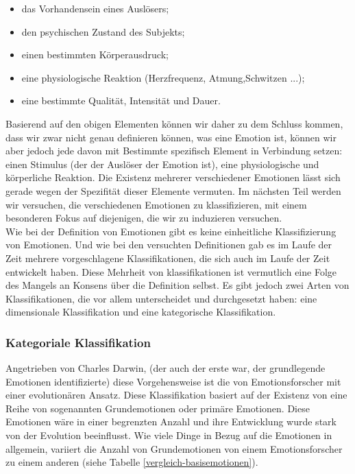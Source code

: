 \begin{itemize} \setlength\itemsep{-0.15cm}
  \item das Vorhandensein eines Auslösers;
  \item den psychischen Zustand des Subjekts;
  \item einen bestimmten Körperausdruck;
  \item eine physiologische Reaktion (Herzfrequenz, Atmung,Schwitzen ...);
  \item eine bestimmte Qualität, Intensität und Dauer.
\end{itemize}


Basierend auf den obigen Elementen können wir daher zu dem Schluss kommen, dass wir zwar nicht genau definieren können, was eine Emotion ist, können wir aber jedoch jede davon mit Bestimmte spezifisch  Element in Verbindung setzen: einen Stimulus (der der Auslöser der Emotion ist), eine physiologische und körperliche Reaktion. 
Die Existenz mehrerer verschiedener Emotionen lässt sich gerade wegen der Spezifität dieser Elemente vermuten. 
Im nächsten Teil werden wir versuchen, die verschiedenen Emotionen zu klassifizieren, mit einem besonderen Fokus auf diejenigen, die wir zu induzieren versuchen. \\


Wie bei der Definition von Emotionen gibt es keine einheitliche Klassifizierung von Emotionen. 
Und wie bei den versuchten Definitionen gab es im Laufe der Zeit mehrere vorgeschlagene Klassifikationen, die sich auch im Laufe der Zeit entwickelt haben. 
Diese Mehrheit von klassifikationen ist vermutlich eine Folge des Mangels an Konsens über die Definition selbst. 
Es gibt jedoch zwei Arten von Klassifikationen, die vor allem unterscheidet und durchgesetzt haben: eine dimensionale Klassifikation\cite{geslin13} und eine kategorische Klassifikation\cite{basic_emotions_theories}.




\subsubsection{Kategoriale Klassifikation} \label{kategoriale-klassifikation}

Angetrieben von Charles Darwin, (der auch der erste war, der grundlegende Emotionen identifizierte) diese Vorgehensweise ist die von Emotionsforscher  mit einer evolutionären Ansatz. 
Diese Klassifikation basiert auf der Existenz von eine Reihe von sogenannten Grundemotionen oder primäre Emotionen. 
Diese  Emotionen wäre in einer begrenzten Anzahl und ihre Entwicklung wurde stark von der Evolution  beeinflusst. 
Wie viele Dinge in Bezug auf die Emotionen in allgemein, variiert die Anzahl von Grundemotionen von einem Emotionsforscher zu einem anderen (siehe Tabelle \ref{vergleich-basisemotionen}).


